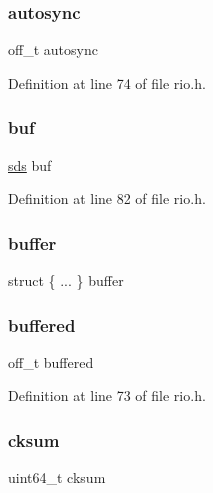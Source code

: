 \subsubsection{\texorpdfstring{autosync}{autosync}}
{\footnotesize\ttfamily off\+\_\+t autosync}



Definition at line 74 of file rio.\+h.

\mbox{\label{struct__rio_ae8dd93102163eea99d3d0949d1974628}} 
\subsubsection{\texorpdfstring{buf}{buf}}
{\footnotesize\ttfamily \hyperlink{sds_8h_ad69abac3df4532879db9642c95f5ef6f}{sds} buf}



Definition at line 82 of file rio.\+h.

\mbox{\label{struct__rio_a08fd4992ea2a6cc4f1cae2d22475e950}} 
\subsubsection{\texorpdfstring{buffer}{buffer}}
{\footnotesize\ttfamily struct \{ ... \}   buffer}

\mbox{\label{struct__rio_aaf9c739870ce662f03414e87c0a3947b}} 
\subsubsection{\texorpdfstring{buffered}{buffered}}
{\footnotesize\ttfamily off\+\_\+t buffered}



Definition at line 73 of file rio.\+h.

\mbox{\label{struct__rio_aa7e1f76c805332914541fb978311b7b4}} 
\subsubsection{\texorpdfstring{cksum}{cksum}}
{\footnotesize\ttfamily uint64\+\_\+t cksum}



